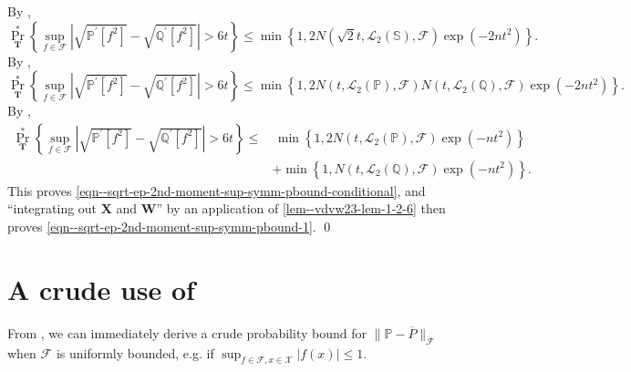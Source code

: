 By ,
\begin{equation*}
  \Pr_{\mathbf{T}}^{\ast} \left\{ \sup_{f \in \mathcal{F}} \left|
  \sqrt{\mathbb{P}^{\prime} \left[ f^{2} \right]} - \sqrt{\mathbb{Q}^{\prime}
  \left[ f^{2} \right]} \right| > 6 t \right\} \leq \min \left\{ 1, 2 N \left(
  \sqrt{2} t, \mathscr{L}_{2} (\mathbb{S}), \mathcal{F} \right) \exp \left( -
  2 n t^{2} \right) \right\}.
\end{equation*}
By ,
\begin{equation*}
  \Pr_{\mathbf{T}}^{\ast} \left\{ \sup_{f \in \mathcal{F}} \left|
  \sqrt{\mathbb{P}^{\prime} \left[ f^{2} \right]} - \sqrt{\mathbb{Q}^{\prime}
  \left[ f^{2} \right]} \right| > 6 t \right\} \leq \min \left\{ 1, 2 N \left(
  t, \mathscr{L}_{2} (\mathbb{P}), \mathcal{F} \right) N \left( t,
  \mathscr{L}_{2} (\mathbb{Q}), \mathcal{F} \right) \exp \left( - 2 n t^{2}
  \right) \right\}.
\end{equation*}
By ,
\begin{equation*}
  \begin{split}
    \Pr_{\mathbf{T}}^{\ast} \left\{ \sup_{f \in \mathcal{F}} \left|
    \sqrt{\mathbb{P}^{\prime} \left[ f^{2} \right]} - \sqrt{\mathbb{Q}^{\prime}
    \left[ f^{2} \right]} \right| > 6 t \right\} \leq
    & \, \min \left\{ 1, 2 N \left( t, \mathscr{L}_{2} (\mathbb{P}), \mathcal{F}
    \right) \exp \left( - n t^{2} \right) \right\} \\
    & + \min \left\{ 1, N \left( t, \mathscr{L}_{2} (\mathbb{Q}), \mathcal{F}
    \right) \exp \left( - n t^{2} \right) \right\}.
  \end{split}
\end{equation*}
This proves \eqref{eqn--sqrt-ep-2nd-moment-sup-symm-pbound-conditional}, and
``integrating out \(\mathbf{X}\) and \(\mathbf{W}\)'' by an application of
\eqref{lem--vdvw23-lem-1-2-6} then proves
\eqref{eqn--sqrt-ep-2nd-moment-sup-symm-pbound-1}.
\qed

\section{A crude use of \texorpdfstring{%
}{Lemma
\ref{lem--ep-sym-unif-hoeffding-cond}}}

From , we can immediately derive a crude
probability bound for \(\|\mathbb{P} - \overline{P} \|_{\mathcal{F}}\)
when \(\mathcal{F}\) is uniformly bounded, e.g. if \(\sup_{f \in \mathcal{F}, x
\in \mathcal{X}} |f (x)| \leq 1\).

